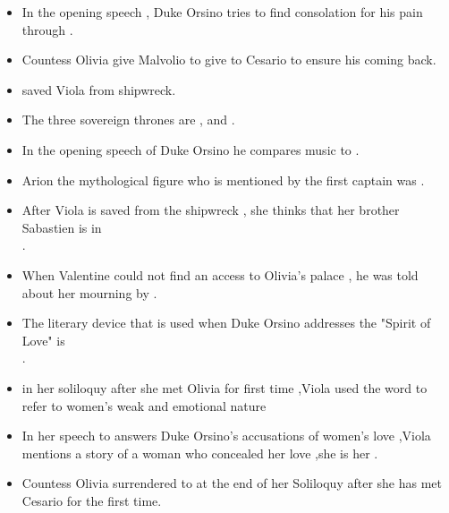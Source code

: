 \documentclass[12pt, a4paper]{article}
\begin{document}
\begin{itemize}
  \item[\ding{99}] In the opening speech , Duke Orsino tries to find consolation for his pain through .

  \item[\ding{99}] Countess Olivia give Malvolio  to give to Cesario to ensure his coming back.

  \item[\ding{99}]  saved Viola from shipwreck.

  \item[\ding{99}] The three sovereign thrones are ,  and .

  \item[\ding{99}] In the opening speech of Duke Orsino he compares music to .

  \item[\ding{99}] Arion the mythological figure who is mentioned by the first captain was .

  \item[\ding{99}] After Viola is saved from the shipwreck , she thinks that her brother Sabastien is in \\ .

  \item[\ding{99}] When Valentine could not find an access to Olivia's palace , he was told about her mourning by .

  \item[\ding{99}] The literary device that is used when Duke Orsino addresses the "Spirit of Love" is\\ .

  \item[\ding{99}] in her soliloquy after she met Olivia for first time  ,Viola used the word   to refer to women's weak and emotional nature

  \item[\ding{99}] In her speech to answers Duke Orsino's accusations of women's love ,Viola mentions a story of a woman who concealed her love ,she is her .

  \item[\ding{99}] Countess Olivia surrendered to  at the end of her Soliloquy after she has met Cesario for the first time.


\end{itemize}
\end{document}
